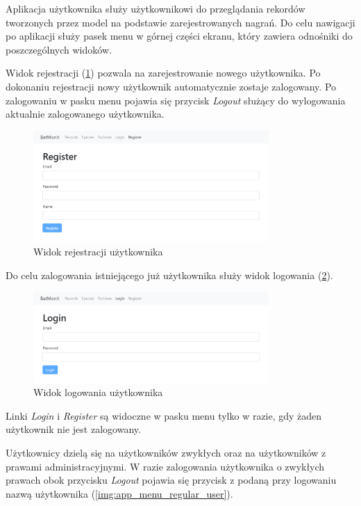 \documentclass{sprz}
\begin{document}
Aplikacja użytkownika służy użytkownikowi do przeglądania rekordów tworzonych przez model na podstawie zarejestrowanych nagrań. Do celu nawigacji po aplikacji służy pasek menu w górnej części ekranu, który zawiera odnośniki do poszczególnych widoków.

Widok rejestracji (\ref{img:app_register}) pozwala na zarejestrowanie nowego użytkownika. Po dokonaniu rejestracji nowy użytkownik automatycznie zostaje zalogowany. Po zalogowaniu w pasku menu pojawia się przycisk \textit{Logout} służący do wylogowania aktualnie zalogowanego użytkownika.
\begin{figure}[h]
  \centering
  \includegraphics[width=0.8\textwidth]{sprz/app_register}
  \caption{Widok rejestracji użytkownika}
  \label{img:app_register}
\end{figure}

Do celu zalogowania istniejącego już użytkownika służy widok logowania (\ref{img:app_login}).
\begin{figure}[h]
  \centering
  \includegraphics[width=0.8\textwidth]{sprz/app_login}
  \caption{Widok logowania użytkownika}
  \label{img:app_login}
\end{figure}
\clearpage

Linki \textit{Login} i \textit{Register} są widoczne w pasku menu tylko w razie, gdy żaden użytkownik nie jest zalogowany.

Użytkownicy dzielą się na użytkowników zwykłych oraz na użytkowników z prawami administracyjnymi. W razie zalogowania użytkownika o zwykłych prawach obok przycisku \textit{Logout} pojawia się przycisk z podaną przy logowaniu nazwą użytkownika (\ref{img:app_menu_regular_user}).
\end{document}
